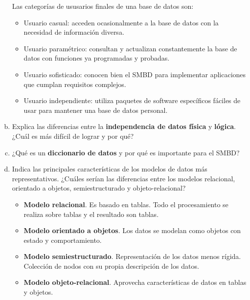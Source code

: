 \documentclass[letterpaper,12pt]{article}
\begin{document}
\begin{enumerate}[a. ]
          Las categorías de ususarios finales de una base de datos son:

        	\begin{itemize}
        		\item Usuario casual: acceden ocasionalmente a la base de datos con la necesidad de información diversa.
        		\item Usuario paramétrico: consultan y actualizan constantemente la base de datos con funciones ya programadas y probadas.
        		\item Usuario sofisticado: conocen bien el SMBD para implementar aplicaciones que cumplan requisitos complejos.
        		\item Usuario independiente: utiliza paquetes de software específicos fáciles de usar para mantener una base de datos personal.
        	\end{itemize}

            \item Explica las diferencias entre la \textbf{independencia de datos física} y \textbf{lógica}. ¿Cuál es más difícil de lograr y por qué? \\

            \item ¿Qué es un \textbf{diccionario de datos} y por qué es importante para el SMBD? \\

            \item Indica las principales características de los modelos de datos más representativos. ¿Cuáles serían las
            diferencias entre los modelos relacional, orientado a objetos, semiestructurado y objeto-relacional? \\
          \begin{itemize}

            \item \textbf{Modelo relacional}. Es basado en tablas. Todo el procesamiento se realiza sobre tablas y el resultado son tablas.
            \item \textbf{Modelo orientado a objetos}. Los datos se modelan como objetos con estado y comportamiento.

            \item \textbf{Modelo semiestructurado}. Representación de los datos menos rígida. Colección de nodos con su propia descripción de los datos.

            \item \textbf{Modelo objeto-relacional}. Aprovecha características de datos en tablas y objetos.


\end{itemize}
\end{enumerate}
\end{document}
